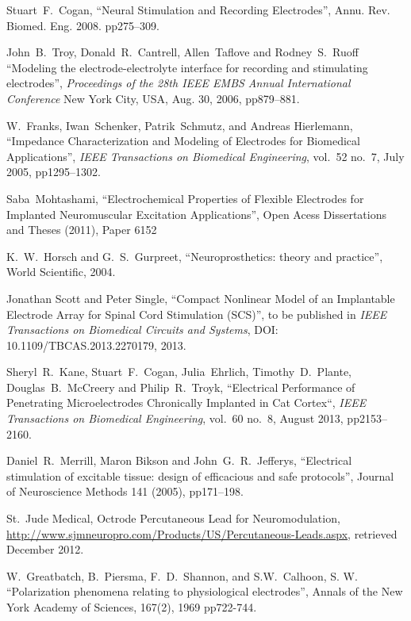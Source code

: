 \documentclass[journal, a4paper]{IEEEtran}
\begin{document}
\begin{thebibliography}{99}


    Stuart~F.~Cogan,
    ``Neural Stimulation and Recording Electrodes'',
    Annu. Rev. Biomed. Eng. 2008. pp275--309.

    John~B.~Troy, Donald~R.~Cantrell, Allen~Taflove and Rodney~S.~Ruoff
    ``Modeling the electrode-electrolyte interface for recording and stimulating electrodes'',
    {\em Proceedings of the 28th IEEE EMBS Annual International Conference}
    New York City, USA, Aug. 30, 2006, pp879--881.

W.~Franks, Iwan~Schenker, Patrik~Schmutz, and Andreas Hierlemann,
``Impedance Characterization and Modeling of Electrodes for Biomedical Applications'',
\emph{IEEE Transactions on Biomedical Engineering},
vol.~52 no.~7, July 2005, pp1295--1302.

    Saba~Mohtashami,
    ``Electrochemical Properties of Flexible Electrodes for Implanted Neuromuscular Excitation Applications'',
    Open Acess Dissertations and Theses (2011), Paper 6152

    K.~W.~Horsch and G.~S.~Gurpreet,
    ``Neuroprosthetics: theory and practice'',
    World Scientific, 2004.

Jonathan Scott and Peter Single,
``Compact Nonlinear Model of an Implantable Electrode Array for Spinal Cord Stimulation (SCS)'',
to be published in
{\em IEEE Transactions on Biomedical Circuits and Systems},
DOI: 10.1109/TBCAS.2013.2270179, 2013.

Sheryl~R.~Kane, Stuart~F.~Cogan, Julia~Ehrlich, Timothy~D.~Plante, Douglas~B.~McCreery and Philip~R.~Troyk,
``Electrical Performance of Penetrating Microelectrodes Chronically Implanted in Cat Cortex``,
{\em IEEE Transactions on Biomedical Engineering},
vol.~60 no.~8, August 2013, pp2153--2160.

Daniel~R.~Merrill, Maron Bikson and John~G.~R.\ Jefferys,
``Electrical stimulation of excitable tissue: design of efficacious and safe protocols'',
Journal of Neuroscience Methods 141 (2005), pp171--198.

St.~Jude Medical, Octrode Percutaneous Lead for Neuromodulation,
\url{http://www.sjmneuropro.com/Products/US/Percutaneous-Leads.aspx},
retrieved December 2012.

W.~Greatbatch, B.~Piersma, F.~D.~Shannon, and S.W.~Calhoon, S. W.
``Polarization phenomena relating to physiological electrodes'',
Annals of the New York Academy of Sciences,
167(2), 1969 pp722-744.


\end{thebibliography}
\end{document}
